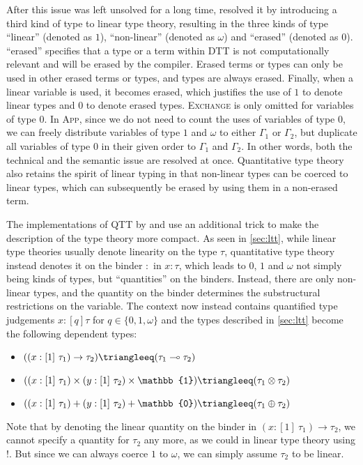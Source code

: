 After this issue was left unsolved for a long time, \cite{lindley_i_2016} resolved it by introducing a third kind of type to linear type theory, resulting in the three kinds of type ``linear'' (denoted as $1$), ``non-linear'' (denoted as $\omega$) and ``erased'' (denoted as $0$). ``erased'' specifies that a type or a term within DTT is not computationally relevant and will be erased by the compiler. Erased terms or types can only be used in other erased terms or types, and types are always erased. Finally, when a linear variable is used, it becomes erased, which justifies the use of $1$ to denote linear types and $0$ to denote erased types. \textsc{Exchange} is only omitted for variables of type $0$. In \textsc{App}, since we do not need to count the uses of variables of type $0$, we can freely distribute variables of type $1$ and $\omega$ to either $\Gamma_1$ or $\Gamma_2$, but duplicate all variables of type $0$ in their given order to $\Gamma_1$ and $\Gamma_2$. In other words, both the technical and the semantic issue are resolved at once. Quantitative type theory also retains the spirit of linear typing in that non-linear types can be coerced to linear types, which can subsequently be erased by using them in a non-erased term.

The implementations of QTT by \cite{lindley_i_2016} and \cite{atkey_syntax_2018} use an additional trick to make the description of the type theory more compact. As seen in \cref{sec:ltt}, while linear type theories usually denote linearity on the type $\tau$, quantitative type theory instead denotes it on the binder $:$ in $x : \tau$, which leads to $0$, $1$ and $\omega$ not simply being kinds of types, but ``quantities'' on the binders. Instead, there are only non-linear types, and the quantity on the binder determines the substructural restrictions on the variable. The context now instead contains quantified type judgements $x :[q] \tau$ for $q \in \{0, 1, \omega\}$ and the types described in \cref{sec:ltt} become the following dependent types:
\begin{itemize}
	\item $((x :[1]\ \tau_1) \to \tau_2) \triangleeq (\tau_1 \multimap \tau_2)$
	\item $((x :[1]\ \tau_1) \times (y :[1]\ \tau_2) \times \mathbb{1}) \triangleeq (\tau_1 \otimes \tau_2)$
	\item $((x :[1]\ \tau_1) + (y :[1]\ \tau_2) + \mathbb{0}) \triangleeq (\tau_1 \oplus \tau_2)$
\end{itemize}
Note that by denoting the linear quantity on the binder in $(x :[1]\ \tau_1) \to \tau_2$, we cannot specify a quantity for $\tau_2$ any more, as we could in linear type theory using $!$. But since we can always coerce $1$ to $\omega$, we can simply assume $\tau_2$ to be linear.

